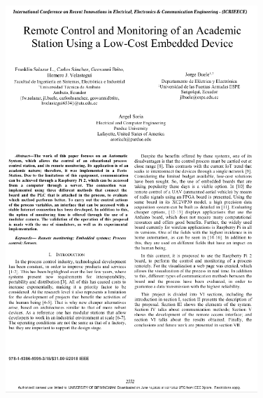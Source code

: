 \begin{figure}[ht]
    \centering
    \includegraphics[width=0.85\textwidth]{5.-Publicaciones/Certificados/5.png}
\end{figure}


